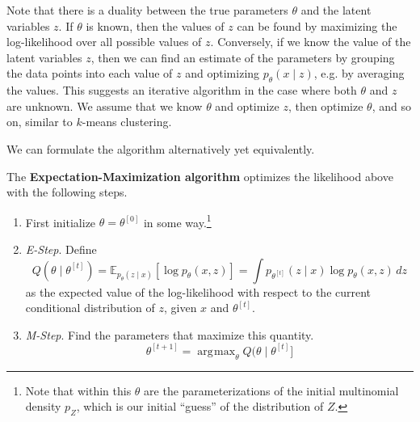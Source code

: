 \documentclass{article}
\DeclareMathOperator*{\argmax}{\arg\!\max}
\begin{document}
  Note that there is a duality between the true parameters $\theta$ and the latent variables $z$. If $\theta$ is known, then the values of $z$ can be found by maximizing the log-likelihood over all possible values of $z$. Conversely, if we know the value of the latent variables $z$, then we can find an estimate of the parameters by grouping the data points into each value of $z$ and optimizing $p_\theta (x \mid z)$, e.g. by averaging the values. This suggests an iterative algorithm in the case where both $\theta$ and $z$ are unknown. We assume that we know $\theta$ and optimize $z$, then optimize $\theta$, and so on, similar to $k$-means clustering. 

  We can formulate the algorithm alternatively yet equivalently.  

  \begin{algo}[EM Algorithm]
    The \textbf{Expectation-Maximization algorithm} optimizes the likelihood above with the following steps. 
    \begin{enumerate}
      \item First initialize $\theta = \theta^{[0]}$ in some way.\footnote{Note that within this $\theta$ are the parameterizations of the initial multinomial density $p_Z$, which is our initial ``guess'' of the distribution of $Z$.}

      \item \textit{E-Step}. Define 
      \begin{equation}
        Q(\theta \mid \theta^{[t]}) = \mathbb{E}_{p_\theta (z \mid x)}[ \log p_\theta(x, z) ] = \int p_{\theta^{[t]}} (z \mid x) \log{p_\theta (x, z)} \,dz
      \end{equation}
      as the expected value of the log-likelihood with respect to the current conditional distribution of $z$, given $x$ and $\theta^{[t]}$. 

      \item \textit{M-Step}. Find the parameters that maximize this quantity. 
      \begin{equation}
        \theta^{[t+1]} = \argmax_\theta Q(\theta \mid \theta^{[t]}]
      \end{equation}
    \end{enumerate}
  \end{algo}
\end{document}
